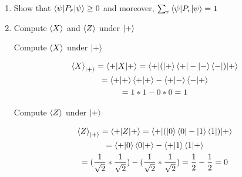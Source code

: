 \documentclass[]{article}
\begin{document}
\begin{enumerate}
\begin{enumerate}
        \item Show that $\braket{\psi|P_r|\psi} \ge 0$ and moreover, $\sum_r \braket{\psi|P_r|\psi} = 1$

        \item Compute $\braket{X}$ and  $\braket{Z}$ under $\ket{+}$

        Compute $\braket{X}$ under $\ket{+}$

        \begin{gather*}
          \braket{X}_{\ket{+}} = \braket{+|X|+} = \braket{+|(\ket{+}\bra{+} - \ket{-}\bra{-})|+}\\
          = \braket{+|+}\braket{+|+} - \braket{+|-}\braket{-|+}\\
          = 1 * 1 - 0 * 0 = 1
        \end{gather*}

        Compute $\braket{Z}$ under $\ket{+}$

        \begin{gather*}
          \braket{Z}_{\ket{+}} = \braket{+|Z|+} = \braket{+|(\ket{0}\bra{0} - \ket{1}\bra{1})|+}\\
          = \braket{+|0}\braket{0|+} - \braket{+|1}\braket{1|+}\\
          = (\frac{1}{\sqrt{2}} * \frac{1}{\sqrt{2}}) - (\frac{1}{\sqrt{2}} * \frac{1}{\sqrt{2}})
          = \frac{1}{2} - \frac{1}{2} = 0
        \end{gather*}



\end{enumerate}
\end{enumerate}
\end{document}
